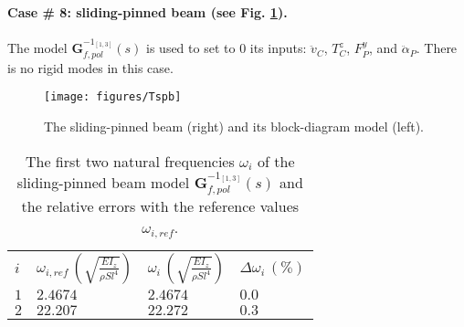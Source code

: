 \paragraph{Case \# 8:  sliding-pinned beam (see Fig. \ref{fig:Tsp}).} The model $\mathbf{G}_{f,pol}^{-1_{[1,3]}}(s)$ is used to set to $0$ its inputs: $\ddot{v}_C$, $T^z_C$, $F^y_P$, and $\ddot{\alpha}_P$. There is no rigid modes in this case.
\begin{figure}[htbp!]
  \texttt{[image: figures/Tspb]}
\caption{The sliding-pinned beam (right) and its block-diagram model (left).}
\label{fig:Tsp} 
\end{figure}
\begin{table}[htbp!]
\caption{The first two natural frequencies $\omega_i$ of the sliding-pinned beam model $\mathbf{G}_{f,pol}^{-1_{[1,3]}}(s)$ and the relative errors with the reference values $\omega_{i,ref}$.}
\label{tab:Tsp}       %
\begin{tabular}{llll}
\hline\noalign{\smallskip}
  $i$ & $\omega_{i,ref}\,\left(\sqrt{\frac{EI_z}{\rho S l^4}}\right)$ &  $\omega_i\,\left(\sqrt{\frac{EI_z}{\rho S l^4}}\right)$ &  $\Delta \omega_i\,(\%)$ \\
\noalign{\smallskip}\hline\noalign{\smallskip}
$1$ & $2.4674$ & $2.4674$  & $0.0$ \\ 
$2$ & $22.207$ & $22.272$ & $0.3$ \\
\hline
\end{tabular}
\end{table}

\FloatBarrier
